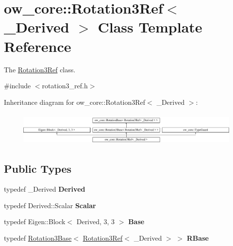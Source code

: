 \hypertarget{classow__core_1_1Rotation3Ref}{}\section{ow\+\_\+core\+:\+:Rotation3\+Ref$<$ \+\_\+\+Derived $>$ Class Template Reference}
\label{classow__core_1_1Rotation3Ref}


The \hyperlink{classow__core_1_1Rotation3Ref}{Rotation3\+Ref} class.  




{\ttfamily \#include $<$rotation3\+\_\+ref.\+h$>$}

Inheritance diagram for ow\+\_\+core\+:\+:Rotation3\+Ref$<$ \+\_\+\+Derived $>$\+:\begin{figure}[H]
\begin{center}
\leavevmode
\includegraphics[height=1.717791cm]{dd/d45/classow__core_1_1Rotation3Ref}
\end{center}
\end{figure}
\subsection*{Public Types}
\begin{DoxyCompactItemize}
\item 
typedef \+\_\+\+Derived {\bfseries Derived}\hypertarget{classow__core_1_1Rotation3Ref_a1997d14d4c8143247e57d9543375f613}{}\label{classow__core_1_1Rotation3Ref_a1997d14d4c8143247e57d9543375f613}

\item 
typedef Derived\+::\+Scalar {\bfseries Scalar}\hypertarget{classow__core_1_1Rotation3Ref_ad49f118f1b6830467c10cfa0045a572b}{}\label{classow__core_1_1Rotation3Ref_ad49f118f1b6830467c10cfa0045a572b}

\item 
typedef Eigen\+::\+Block$<$ Derived, 3, 3 $>$ {\bfseries Base}\hypertarget{classow__core_1_1Rotation3Ref_ac13bad574a7fe662762aba5e6b6d5f36}{}\label{classow__core_1_1Rotation3Ref_ac13bad574a7fe662762aba5e6b6d5f36}

\item 
typedef \hyperlink{classow__core_1_1Rotation3Base}{Rotation3\+Base}$<$ \hyperlink{classow__core_1_1Rotation3Ref}{Rotation3\+Ref}$<$ \+\_\+\+Derived $>$ $>$ {\bfseries R\+Base}\hypertarget{classow__core_1_1Rotation3Ref_ad3cefc7a1f9b019ad262dd82dc6ffbb7}{}\label{classow__core_1_1Rotation3Ref_ad3cefc7a1f9b019ad262dd82dc6ffbb7}

\end{DoxyCompactItemize}
